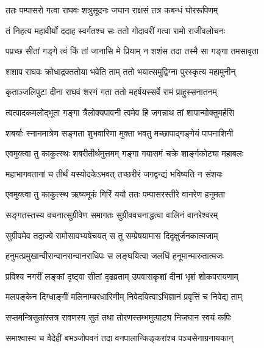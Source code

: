 \twolineshloka
{ततः पम्पासरो गत्वा राघवः शत्रुसूदनः}
{जघान राक्षसं तत्र कबन्धं घोररूपिणम्}%

\twolineshloka
{तं निहत्य महावीर्यो ददाह स्वर्गतश्च सः}
{ततो गोदावरीं गत्वा रामो राजीवलोचनः}%

\twolineshloka
{पप्रच्छ सीतां गङ्गे त्वं किं तां जानासि मे प्रियाम्}
{न शशंस तदा तस्मै सा गङ्गा तमसावृता}%

\twolineshloka
{शशाप राघवः क्रोधाद्रक्ततोया भवेति ताम्}
{ततो भयात्समुद्विग्ना पुरस्कृत्य महामुनीन्}%

\twolineshloka
{कृताञ्जलिपुटा दीना राघवं शरणं गता}
{ततो महर्षयस्सर्वे रामं प्राहुस्सनातनम्}%


\twolineshloka
{त्वत्पादकमलोद्भूता गङ्गा त्रैलोक्यपावनी}
{त्वमेव हि जगन्नाथ तां शापान्मोक्तुमर्हसि}%




\twolineshloka
{शबर्याः स्नानमात्रेण सङ्गता शुभवारिणा}
{मुक्ता भवतु मच्छापाद्गङ्गेयं पापनाशिनी}%

\twolineshloka
{एवमुक्त्वा तु काकुत्स्थः शबरीतीर्थमुत्तमम्}
{गङ्गा गयासमं चक्रे शार्ङ्गकोट्या महाबलः}%

\twolineshloka
{महाभागवतानां च तीर्थं यस्योदकेऽभवत्}
{तच्छरीरं जगद्वन्द्यं भविष्यति न संशयः}%

\twolineshloka
{एवमुक्त्वा तु काकुत्स्थ ऋष्यमूकं गिरिं ययौ}
{ततः पम्पासरस्तीरे वानरेण हनूमता}%

\twolineshloka
{सङ्गतस्तस्य वचनात्सुग्रीवेण समागतः}
{सुग्रीववचनाद्धत्वा वालिनं वानरेश्वरम्}%

\twolineshloka
{सुग्रीवमेव तद्राज्ये रामोसावभ्यषेचयत्}
{स तु सम्प्रेषयामास दिदृक्षुर्जनकात्मजाम्}%

\twolineshloka
{हनुमत्प्रमुखान्वीरान्वानरान्वानराधिपः}
{स लङ्घयित्वा जलधिं हनूमान्मारुतात्मजः}%

\twolineshloka
{प्रविश्य नगरीं लङ्कां दृष्ट्वा सीतां दृढव्रताम्}
{उपवासकृशां दीनां भृशं शोकपरायणाम्}%

\twolineshloka
{मलपङ्केन दिग्धाङ्गीं मलिनाम्बरधारिणीम्}
{निवेदयित्वाऽभिज्ञानं प्रवृत्तिं च निवेद्य ताम्}%

\twolineshloka
{सप्तमन्त्रिसुतांस्तत्र रावणस्य सुतं तथा}
{तोरणस्तम्भमुत्पाट्य निजघान स्वयं कपिः}%

\twolineshloka
{समाश्वास्य च वैदेहीं बभञ्जोपवनं तदा}
{वनपालान्किङ्करांश्च पञ्चसेनाग्रनायकान्}%

